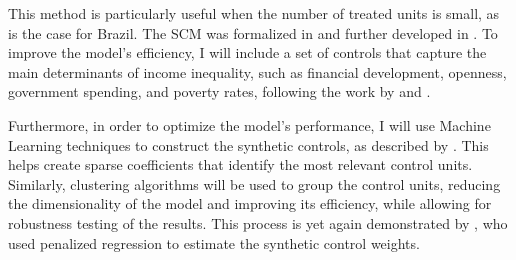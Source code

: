 \documentclass[a4paper, 12pt]{article}
\begin{document}
This method is particularly useful when the number of treated units is small, as is the case for Brazil.
The SCM was formalized in \cite{abadie2003economic} and further developed in \cite{abadie2010synthetic}.
To improve the model’s efficiency, I will include a set of controls that capture the main determinants of income inequality, such as financial development, openness, government spending, and poverty rates, following the work by \cite{afandi2017determinants} and \cite{roine2009long}.
\pagebreak
\par
Furthermore, in order to optimize the model’s performance, I will use Machine Learning techniques to construct the synthetic controls, as described by \cite{araujo2023synthetic}.
This helps create sparse coefficients that identify the most relevant control units.
Similarly, clustering algorithms will be used to group the control units, reducing the dimensionality of the model and improving its efficiency, while allowing for robustness testing of the results.
This process is yet again demonstrated by \cite{abadie2023penalized}, who used penalized regression to estimate the synthetic control weights.
\end{document}
